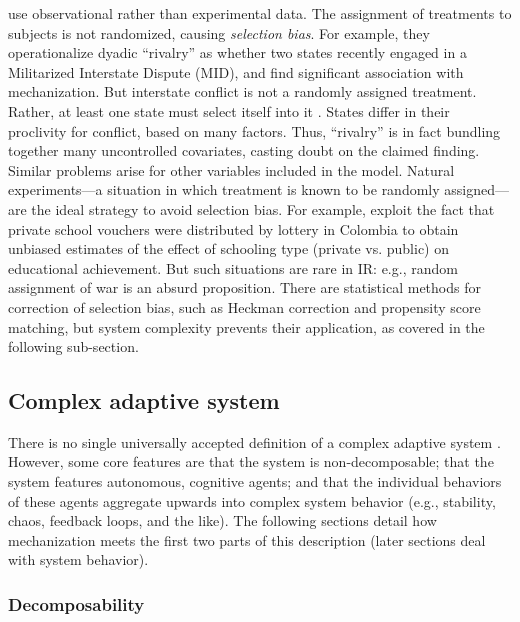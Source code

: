 \documentclass{article}
\begin{document}
\citet{sechser2010army} use observational rather than experimental
data. The assignment of treatments to subjects is not randomized, causing
\textit{selection bias}. For example, they operationalize
dyadic ``rivalry'' as whether two states recently engaged in a Militarized
Interstate Dispute (MID), and find significant association with mechanization. 
But interstate conflict is not a randomly assigned treatment. Rather, at least one state must select
itself into it \citep{fearon2002selection}. States differ in their
proclivity for conflict, based on many factors. 
Thus, ``rivalry'' is in fact
bundling together many uncontrolled covariates, casting doubt on the claimed
finding. Similar problems arise for other variables included in the model.
Natural experiments---a situation in which treatment is
known to be randomly assigned---are the ideal strategy to avoid selection bias. For
example, \citet{angrist2002vouchers} exploit the fact that private school
vouchers were distributed by lottery in Colombia to obtain unbiased estimates of
the effect of schooling type (private vs. public) on educational achievement.
But such situations are rare in IR: e.g., random assignment of war is an
absurd proposition. There are statistical methods for correction of selection
bias, such as Heckman correction and propensity score matching, but system
complexity prevents their application, as covered in the following sub-section.

\subsection{Complex adaptive system}

There is no single universally accepted definition of a complex adaptive system
\citep{miller2009complex}. However, some core features are
that the system is non-decomposable; that the system features autonomous, cognitive
agents; and that the individual behaviors of these agents aggregate upwards into
complex system behavior (e.g., stability, chaos, feedback loops, and the like). 
The following sections detail how mechanization meets the first two parts of
this description (later sections deal with system behavior). 

\subsubsection{Decomposability}
\end{document}
